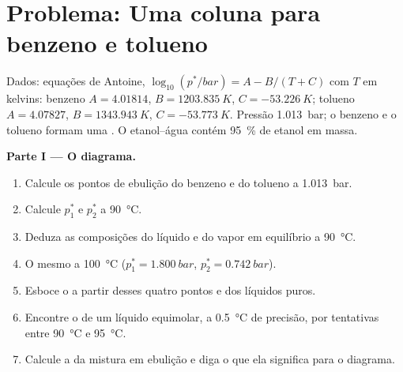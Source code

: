 \section{Problema: Uma coluna para benzeno e tolueno}

\begin{problem}
\label{pb:b2:liquid-vapour-diagrams:1}
Dados: equações de Antoine, $\log_{10}(p^*/\unit{bar}) = A - B/(T + C)$ com $T$ em
kelvins: benzeno $A = 4.01814$, $B = \qty{1203.835}{K}$, $C =
\qty{-53.226}{K}$; tolueno $A = 4.07827$, $B = \qty{1343.943}{K}$, $C =
\qty{-53.773}{K}$. Pressão \qty{1.013}{bar}; o benzeno e o tolueno formam uma
. O  etanol--água contém 95~\% de etanol em massa.

\medskip
\noindent\textbf{Parte I --- O diagrama.}
\begin{enumerate}
  \item Calcule os pontos de ebulição do benzeno e do tolueno a \qty{1.013}{bar}.
  \item Calcule $p_1^*$ e $p_2^*$ a \qty{90}{\degreeCelsius}.
  \item Deduza as composições do líquido e do vapor em equilíbrio
        a \qty{90}{\degreeCelsius}.
  \item O mesmo a \qty{100}{\degreeCelsius} ($p_1^* = \qty{1.800}{bar}$, $p_2^* =
        \qty{0.742}{bar}$).
  \item Esboce o  a partir desses quatro pontos e dos líquidos puros.
  \item Encontre o  de um líquido equimolar, a
        \qty{0.5}{\degreeCelsius} de precisão, por tentativas entre \qty{90}{\degreeCelsius} e
        \qty{95}{\degreeCelsius}.
  \item Calcule a  da mistura em ebulição e diga o que ela significa
        para o diagrama.
\end{enumerate}


\end{problem}
